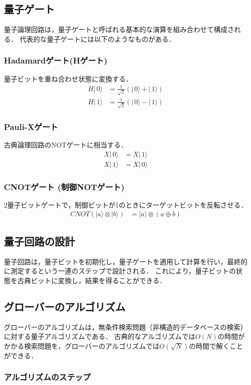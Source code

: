 \documentclass[titlepage,a4paper]{jsarticle}
\begin{document}
\subsection*{量子ゲート}
量子論理回路は，量子ゲートと呼ばれる基本的な演算を組み合わせて構成される．
代表的な量子ゲートには以下のようなものがある．
\subsubsection*{Hadamardゲート(Hゲート)}
量子ビットを重ね合わせ状態に変換する．
\begin{align}
  H|\,0\rangle & = \frac{1}{\sqrt{2}}\left(|\,0\rangle + | \, 1 \rangle\right) \\
  H|\,1\rangle & = \frac{1}{\sqrt{2}}\left(|\,0\rangle - | \, 1 \rangle\right)
\end{align}
\subsubsection*{Pauli-Xゲート}
古典論理回路のNOTゲートに相当する．
\begin{align}
  X|\,0\rangle & = X|\,1\rangle \\
  X|\,1\rangle & = X|\,0\rangle
\end{align}
\subsubsection*{CNOTゲート (制御NOTゲート)}
2量子ビットゲートで，制御ビットが1のときにターゲットビットを反転させる．
\begin{align}
  CNOT(|a\rangle \otimes |b\rangle) & = |a\rangle \otimes(a \oplus b)
\end{align}

\subsection*{量子回路の設計}
量子回路は，量子ビットを初期化し，量子ゲートを適用して計算を行い，最終的に測定するという一連のステップで設計される．
これにより，量子ビットの状態を古典ビットに変換し，結果を得ることができる．
\subsection{グローバーのアルゴリズム}
グローバーのアルゴリズムは，無条件検索問題（非構造的データベースの検索）に対する量子アルゴリズムである．
古典的なアルゴリズムでは$O(N)$の時間がかかる検索問題を，グローバーのアルゴリズムでは$O(\sqrt{N})$の時間で解くことができる．
\subsubsection*{アルゴリズムのステップ}
\end{document}
